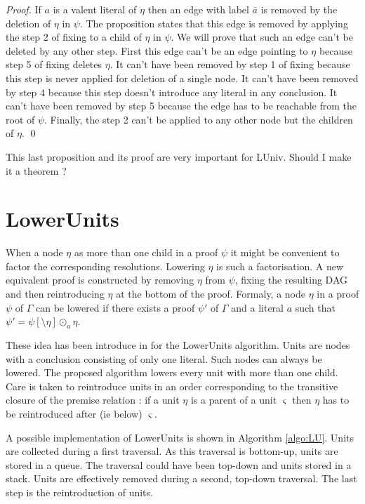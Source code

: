 \documentclass{llncs}
\newcommand{\dual}[1]{{\ensuremath{\bar{#1}}}}
\newenvironment{jogo}{\color{teal}}{}
\begin{document}
\begin{proof}
If $a$ is a valent literal of $\eta$ then an edge with label $\dual{a}$ is removed by the deletion of
$\eta$ in $\psi$. The proposition states that this edge is removed by applying the step 2 of fixing
to a child of $\eta$ in $\psi$. We will prove that such an edge can't be deleted by any other step.
First this edge can't be an edge pointing to $\eta$ because step 5 of fixing deletes $\eta$.
It can't have been removed by step 1 of fixing because this step is never applied for deletion of a
single node.
It can't have been removed by step 4 because this step doesn't introduce any literal in any conclusion.
It can't have been removed by step 5 because the edge has to be reachable from the root of $\psi$.
Finally, the step 2 can't be applied to any other node but the children
of $\eta$. \qed
\end{proof}

\begin{jogo}
This last proposition and its proof are very important for LUniv. Should I make it a theorem ?
\end{jogo}


\section{LowerUnits}

When a node $\eta$ as more than one child in a proof $\psi$ it might be convenient to factor the
corresponding resolutions. Lowering $\eta$ is such a factorisation. A new equivalent proof is
constructed by removing $\eta$ from $\psi$, fixing the resulting DAG and then reintroducing $\eta$
at the bottom of the proof. Formaly, a node $\eta$ in a proof $\psi$ of $\Gamma$ can be lowered if
there exists a proof $\psi'$ of $\Gamma$ and a literal $a$ such that $\psi' = \psi[\setminus \eta]
\odot_a \eta$.

These idea has been introduce in \cite{LURPI} for the LowerUnits algorithm. Units are nodes with a
conclusion consisting of only one literal. Such nodes can always be lowered. The proposed algorithm
lowers every unit with more than one child. Care is taken to reintroduce units in an order
corresponding to the transitive closure of the premise relation : if a unit $\eta$ is a parent of a
unit $\varsigma$ then $\eta$ has to be reintroduced after (ie below) $\varsigma$.

A possible implementation of LowerUnits is shown in Algorithm \ref{algo:LU}. Units are collected during a
first traversal. As this traversal is bottom-up, units are stored in a queue. The traversal could
have been top-down and units stored in a stack. Units are effectively removed during a second,
top-down traversal. The last step is the reintroduction of units.
\end{document}
